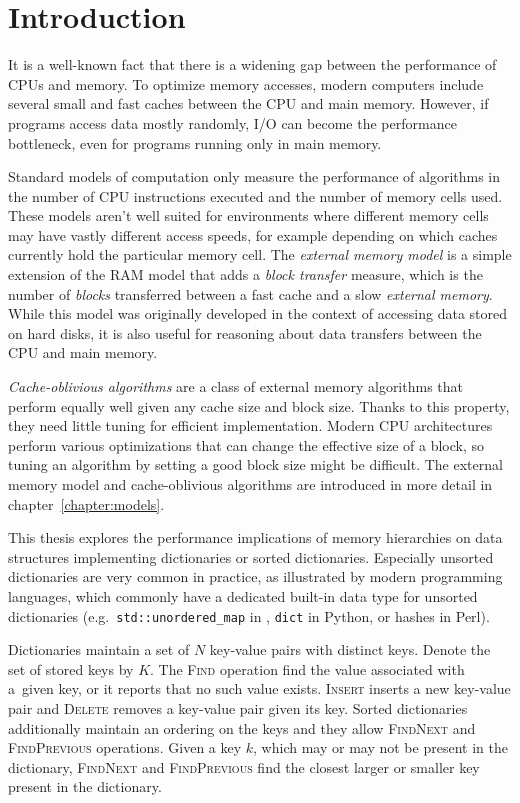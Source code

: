 \chapter*{Introduction}

It is a well-known fact that there is a widening gap between
the performance of CPUs and memory. To optimize memory accesses,
modern computers include several small and fast caches between the CPU and
main memory. However, if programs access data mostly randomly, I/O can become
the performance bottleneck, even for programs running only in main memory.

Standard models of computation only measure the performance of algorithms
in the number of CPU instructions executed and the number of memory cells used.
These models aren't well suited for environments where different memory cells
may have vastly different access speeds, for example depending on which caches
currently hold the particular memory cell. The \emph{external memory model} is
a simple extension of the RAM model that adds a \emph{block transfer} measure,
which is the number of \emph{blocks} transferred between a fast cache and
a slow \emph{external memory}. While this model was originally developed
in the context of accessing data stored on hard disks, it is also useful
for reasoning about data transfers between the CPU and main memory.

\emph{Cache-oblivious algorithms} are a class of external memory algorithms
that perform equally well given any cache size and block size. Thanks to this
property, they need little tuning for efficient implementation.
Modern CPU architectures perform various optimizations that can change
the effective size of a block, so tuning an algorithm by setting a good block
size might be difficult.
The external memory model and cache-oblivious algorithms are introduced in more
detail in chapter~\ref{chapter:models}.

This thesis explores the performance implications of memory hierarchies
on data structures implementing dictionaries or sorted dictionaries.
Especially unsorted dictionaries are very common in practice, as illustrated
by modern programming languages, which commonly have a dedicated built-in
data type for unsorted dictionaries (e.g.\ \texttt{std::unordered\_map} in
\Cpp, \texttt{dict} in Python, or hashes in Perl).

Dictionaries maintain a set of $N$ key-value pairs with distinct keys.
Denote the set of stored keys by $K$.
The \textsc{Find} operation find the value associated with a~given key, or
it reports that no such value exists. \textsc{Insert} inserts a new
key-value pair and \textsc{Delete} removes a key-value pair given its key.
Sorted dictionaries additionally maintain an ordering on the keys and they
allow \textsc{FindNext} and \textsc{FindPrevious} operations.
Given a key $k$, which may or may not be present in the dictionary,
\textsc{FindNext} and \textsc{FindPrevious} find the closest larger or smaller
key present in the dictionary.


